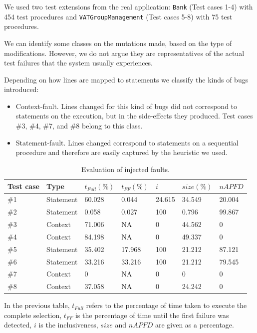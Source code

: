 \documentclass{article}
\begin{document}
We used two test extensions from the real application: \texttt{Bank} (Test cases 1-4) with 454 test procedures and \texttt{VATGroupManagement} (Test cases 5-8) with 75 test procedures. 

We can identify some classes on the mutations made, based on the type of modifications. However, we do not argue they are representatives of the actual test failures that the system usually experiences. 

Depending on how lines are mapped to statements we classify the kinds of bugs introduced:

\begin{itemize}
\item Context-fault. Lines changed for this kind of bugs did not correspond to statements on the execution, but in the side-effects they produced. Test cases \#3, \#4, \#7, and \#8 belong to this class.
\item Statement-fault. Lines changed correspond to statements on a sequential procedure and therefore are easily captured by the heuristic we used. 
\end{itemize}

\begin{table}[H]
\centering
\begin{tabular}{||l|l|l|l|l|l|l||}
\hline
Test case& Type&$t_{Full} (\%)$ & $t_{FF} (\%)$ & $i$ & $size (\%)$ & $nAPFD$ \\ \hline\hline
\#1&Statement&60.028 & 0.044 & 24.615 & 34.549 & 20.004\\
\#2&Statement&0.058 & 0.027 & 100 & 0.796 & 99.867 \\
\#3&Context&71.006 & NA & 0 & 44.562 & 0\\
\#4&Context&84.198 & NA & 0 & 49.337 & 0 \\
\#5&Statement&35.402 & 17.968 & 100 & 21.212 & 87.121 \\
\#6&Statement&33.216 & 33.216 & 100 & 21.212 & 79.545 \\
\#7&Context&0 & NA & 0 & 0 & 0 \\
\#8&Context&37.058 & NA & 0 & 24.242 & 0 \\
\hline
\end{tabular}
\caption{Evaluation of injected faults.}
\label{table:evaluation}
\end{table}

In the previous table, $t_{Full}$ refers to the percentage of time taken to execute the complete selection, $t_{FF}$ is the percentage of time until the first failure was detected, $i$ is the inclusiveness, $size$ and $nAPFD$ are given as a percentage.
\end{document}
